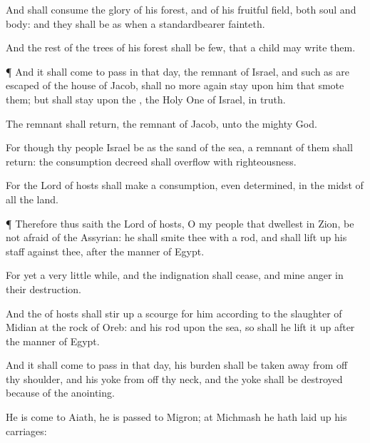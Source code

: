 {And shall
consume the
glory of his
forest, and of his fruitful
field, both
soul and
body: and they shall be as when a
standardbearer
fainteth.

And the
rest of the
trees of his
forest shall be
few, that a
child may
write them.


\par }{\PP {}¶ And it shall come to pass in that
day,
{} the
remnant of
Israel, and such as are
escaped of the
house of
Jacob, shall no more
again
stay upon him that
smote them; but shall
stay upon the
{}, the Holy
One of
Israel, in
truth.

The
remnant shall
return,
{} the
remnant of
Jacob, unto the
mighty
God.

For though thy
people
Israel be as the
sand of the
sea,
{} a
remnant of them shall
return: the
consumption
decreed shall
overflow with
righteousness.

For the
Lord
{} of
hosts shall
make a
consumption, even
determined, in the
midst of all the
land.


\par }{\PP {}¶ Therefore thus
saith the
Lord
{} of
hosts, O my
people that
dwellest in
Zion, be not
afraid of the
Assyrian: he shall
smite thee with a
rod, and shall lift
up his
staff against thee, after the
manner of
Egypt.

For yet a
very little
while, and the
indignation shall
cease, and mine
anger in their
destruction.

And the
{} of
hosts shall stir
up a
scourge for him according to the
slaughter of
Midian at the
rock of
Oreb: and
{} his
rod
{} upon the
sea, so shall he lift it
up after the
manner of
Egypt.

And it shall come to pass in that
day,
{} his
burden shall be taken
away from off thy
shoulder, and his
yoke from off thy
neck, and the
yoke shall be
destroyed
because of the
anointing.

He is
come to
Aiath, he is
passed to
Migron; at
Michmash he hath laid
up his
carriages:

}
